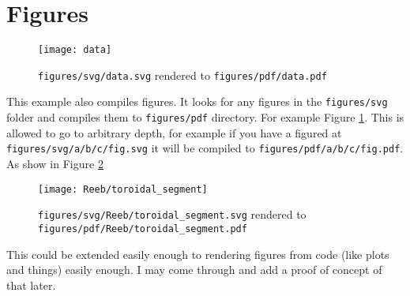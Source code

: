 \section{Figures}

\begin{figure}[!htbp]
  \centering
  \texttt{[image: data]}
  \caption{\texttt{figures/svg/data.svg} rendered to \texttt{figures/pdf/data.pdf}}
\label{fig:data}
\end{figure}
This example also compiles figures. It looks for any figures in the \texttt{figures/svg} folder and compiles them to \texttt{figures/pdf} directory. For example Figure \ref{fig:data}. This is allowed to go to arbitrary depth, for example if you have a figured at \texttt{figures/svg/a/b/c/fig.svg} it will be compiled to \texttt{figures/pdf/a/b/c/fig.pdf}. As show in Figure \ref{fig:reeb}
\begin{figure}[!htbp]
  \centering
  \texttt{[image: Reeb/toroidal\_segment]}
  \caption{\texttt{figures/svg/Reeb/toroidal\_segment.svg} rendered to \texttt{figures/pdf/Reeb/toroidal\_segment.pdf}}
\label{fig:reeb}
\end{figure}
This could be extended easily enough to rendering figures from code (like plots and things) easily enough. I may come through and add a proof of concept of that later. 
